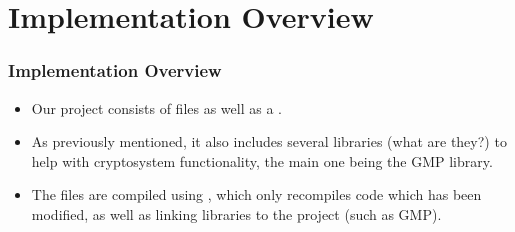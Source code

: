 \section{Implementation Overview}



\begin{frame}
\frametitle{Implementation Overview}
\begin{itemize}
\item Our project consists of  files as well
  as a .
\item As previously mentioned, it also includes several
  libraries (what are they?) to help with cryptosystem
  functionality, the main one being the GMP library.
\item The  files are compiled using
  , which only recompiles code which has been
  modified, as well as linking libraries to the project
  (such as GMP).
\end{itemize}
\end{frame}
